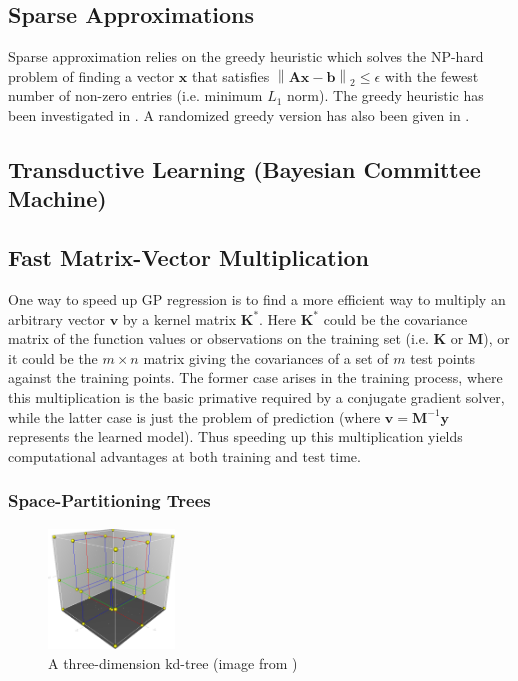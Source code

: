 \documentclass{article}
\begin{document}
\subsection{Sparse Approximations}
Sparse approximation relies on the greedy heuristic which solves the NP-hard problem of finding a vector $\mathbf{x}$ that satisfies $\left \| \mathbf{A}\mathbf{x} -\mathbf{b} \right \|_2\leq \epsilon $ with the fewest number of non-zero entries (i.e. minimum $L_1$ norm). The greedy heuristic has been investigated in \cite{natarajan}. A randomized greedy version has also been given in \cite{smolaGreedy}.

\subsection{Transductive Learning (Bayesian Committee Machine)}



\subsection{Fast Matrix-Vector Multiplication}

One way to speed up GP regression is to find a more efficient way to multiply an arbitrary vector $\mathbf{v}$ by a kernel matrix $\mathbf{K^*}$. Here $\mathbf{K}^*$ could be the covariance matrix of the function values or observations on the training set (i.e. $\mathbf{K}$ or $\mathbf{M}$), or it could be the $m \times n$ matrix giving the covariances of a set of $m$ test points against the training points. The former case arises in the training process, where this multiplication is the basic primative required by a conjugate gradient solver, while the latter case is just the problem of prediction (where $\mathbf{v} = \mathbf{M}^{-1}\mathbf{y}$ represents the learned model). Thus speeding up this multiplication yields computational advantages at both training and test time. 

\subsubsection{Space-Partitioning Trees}
\begin{figure} 

  \centering
    \includegraphics[width=0.3\textwidth]{3dtree}
  \caption{A three-dimension kd-tree (image from \cite{wiki:kdtree})}
  \label{fig:kdtree}
\end{figure}
\end{document}
